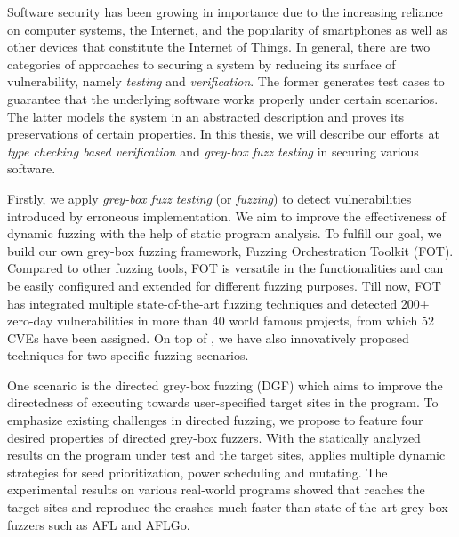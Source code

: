 Software security has been growing in importance due to the increasing reliance on computer systems, the Internet, and the popularity of smartphones as well as other devices that constitute the Internet of Things.
In general, there are two categories of approaches to securing a system by reducing its surface of vulnerability, namely \emph{testing} and \emph{verification}. The former
 generates test cases to guarantee that the underlying software works properly under certain scenarios.
 The latter models the system in an abstracted description and proves its preservations of certain properties.
  In this thesis, we will describe our efforts at \emph{type checking based verification} and \emph{grey-box fuzz testing} in securing various software.

Firstly, we apply \emph{grey-box fuzz testing} (or \emph{fuzzing}) to detect vulnerabilities introduced by erroneous implementation. We aim to improve the effectiveness of dynamic fuzzing with the help of static program analysis. To fulfill our goal, we build our own grey-box fuzzing framework, Fuzzing Orchestration Toolkit (FOT). Compared to other fuzzing tools, FOT is versatile in the functionalities and can be easily configured and extended for different fuzzing purposes. Till now, FOT has integrated multiple state-of-the-art fuzzing techniques and detected 200+ zero-day vulnerabilities in more than 40 world famous projects, from which 52 CVEs have been assigned.
On top of \FOT, we have also innovatively proposed techniques for two specific fuzzing scenarios.

One scenario is the directed grey-box fuzzing (DGF) which aims to improve the directedness of executing towards user-specified target sites in the program. To emphasize existing challenges in \mbox{directed} fuzzing, we propose \dFOT to feature four desired properties of directed grey-box fuzzers. With the statically analyzed results on the program under test and the target sites, \dFOT applies multiple dynamic strategies for seed prioritization, power scheduling and \mbox{mutating}.
The experimental results on various real-world \mbox{programs} showed that \dFOT reaches the target sites and reproduce the crashes much faster than state-of-the-art grey-box fuzzers such as AFL and AFLGo.

